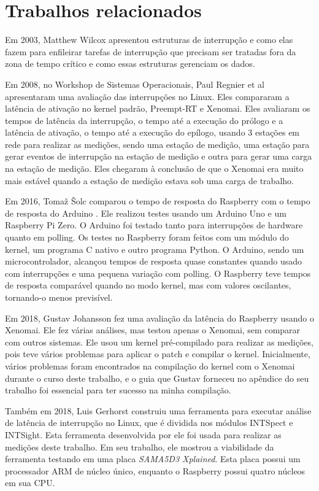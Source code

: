 \section{Trabalhos relacionados}

Em 2003, Matthew Wilcox \cite{Wilcox2003} apresentou estruturas de interrupção e como elas fazem para enfileirar tarefas de interrupção que precisam ser tratadas fora da zona de tempo crítico e como essas estruturas gerenciam os dados.

Em 2008, no Workshop de Sistemas Operacionais, Paul Regnier et al \cite{Regnier2008} apresentaram uma avaliação das interrupções no Linux. Eles compararam a latência de ativação no kernel padrão, Preempt-RT e Xenomai. Eles avaliaram os tempos de latência da interrupção, o tempo até a execução do prólogo e a latência de ativação, o tempo até a execução do epílogo, usando 3 estações em rede para realizar as medições, sendo uma estação de medição, uma estação para gerar eventos de interrupção na estação de medição e outra para gerar uma carga na estação de medição. Eles chegaram à conclusão de que o Xenomai era muito mais estável quando a estação de medição estava sob uma carga de trabalho.

Em 2016, Tomaž Šolc comparou o tempo de resposta do Raspberry com o tempo de resposta do Arduino \cite{Solc2016}. Ele realizou testes usando um Arduino Uno e um Raspberry Pi Zero. O Arduino foi testado tanto para interrupções de hardware quanto em polling. Os testes no Raspberry foram feitos com um módulo do kernel, um programa C nativo e outro programa Python. O Arduino, sendo um microcontrolador, alcançou tempos de resposta quase constantes quando usado com interrupções e uma pequena variação com polling. O Raspberry teve tempos de resposta comparável quando no modo kernel, mas com valores oscilantes, tornando-o menos previsível.

Em 2018, Gustav Johansson \cite{Johansson2018} fez uma avaliação da latência do Raspberry usando o Xenomai. Ele fez várias análises, mas testou apenas o Xenomai, sem comparar com outros sistemas. Ele usou um kernel pré-compilado para realizar as medições, pois teve vários problemas para aplicar o patch e compilar o kernel. Inicialmente, vários problemas foram encontrados na compilação do kernel com o Xenomai durante o curso deste trabalho, e o guia que Gustav forneceu no apêndice do seu trabalho foi essencial para ter sucesso na minha compilação.

Também em 2018, Luis Gerhorst \cite{Gerhorst2018} construiu uma ferramenta para executar análise de latência de interrupção no Linux, que é dividida nos módulos INTSpect e INTSight. Esta ferramenta desenvolvida por ele foi usada para realizar as medições deste trabalho. Em seu trabalho, ele mostrou a viabilidade da ferramenta testando em uma placa \textit{SAMA5D3 Xplained}. Esta placa possui um processador ARM de núcleo único, enquanto o Raspberry possui quatro núcleos em sua CPU.

